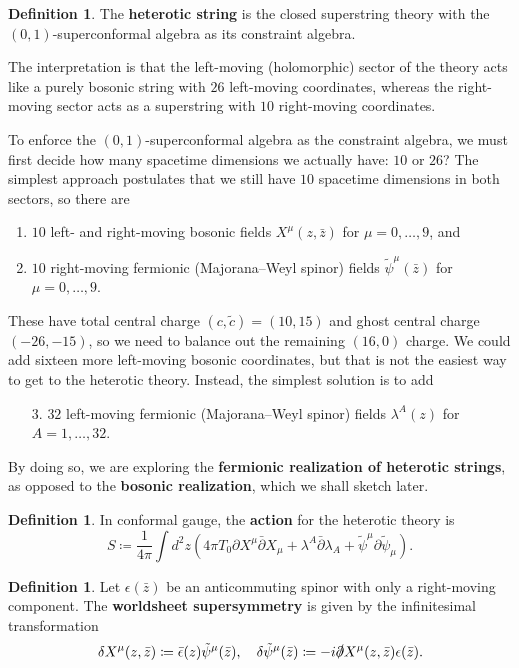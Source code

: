 \documentclass{report}
\theoremstyle{plain}
\theoremstyle{definition}
\newtheorem{definition}[theorem]{Definition}
\theoremstyle{remark}
\newcommand{\di}{\partial}
\newcommand{\bz}{\bar{z}}
\newcommand{\bdi}{\bar{\di}}
\begin{document}
\begin{definition}
  The {\bf heterotic string} is the closed superstring theory with the
  $(0,1)$-superconformal algebra as its constraint algebra.
\end{definition}

The interpretation is that the left-moving (holomorphic) sector of the
theory acts like a purely bosonic string with $26$ left-moving
coordinates, whereas the right-moving sector acts as a superstring
with $10$ right-moving coordinates.

To enforce the $(0,1)$-superconformal algebra as the constraint
algebra, we must first decide how many spacetime dimensions we
actually have: $10$ or $26$? The simplest approach postulates that we
still have $10$ spacetime dimensions in both sectors, so there are
\begin{enumerate}
\item $10$ left- and right-moving bosonic fields $X^\mu(z, \bz)$
  for $\mu = 0, \ldots, 9$, and
\item $10$ right-moving fermionic (Majorana--Weyl spinor) fields $\tilde{\psi}^\mu(\bz)$ for
  $\mu = 0, \ldots, 9$.
\end{enumerate}
These have total central charge $(c, \tilde{c}) = (10, 15)$ and ghost
central charge $(-26, -15)$, so we need to balance out the remaining
$(16, 0)$ charge. We could add sixteen more left-moving bosonic
coordinates, but that is not the easiest way to get to the heterotic
theory. Instead, the simplest solution is to add
\begin{enumerate}
\item[3.] $32$ left-moving fermionic (Majorana--Weyl spinor) fields
  $\lambda^A(z)$ for $A = 1, \ldots, 32$.
\end{enumerate}
By doing so, we are exploring the {\bf fermionic realization of
  heterotic strings}, as opposed to the {\bf bosonic realization},
which we shall sketch later.

\begin{definition}
  In conformal gauge, the {\bf action} for the heterotic theory is
  \[ S \coloneqq \frac{1}{4\pi} \int d^2z (4\pi T_0 \di X^\mu \bdi X_\mu + \lambda^A \bdi \lambda_A + \tilde{\psi}^\mu \di \tilde{\psi}_\mu). \]
\end{definition}

\begin{definition}
  Let $\epsilon(\bz)$ be an anticommuting spinor with only a
  right-moving component. The {\bf worldsheet supersymmetry} is given
  by the infinitesimal transformation
  \[ \delta X^\mu(z,\bz) \coloneqq \bar{\epsilon}(z) \tilde{\psi}^\mu(\bz), \quad \delta \tilde{\psi}^\mu(\bz) \coloneqq -i \slashed{\di} X^\mu(z,\bz) \epsilon(\bz). \]
\end{definition}
\end{document}
